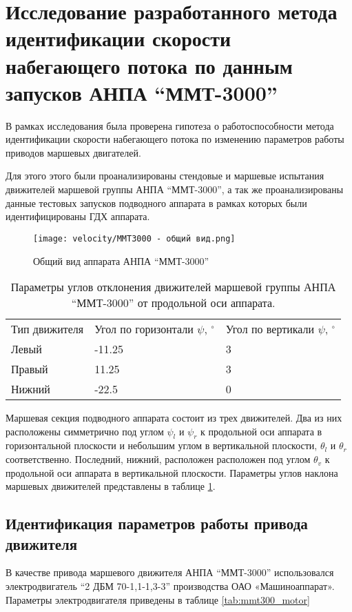 \section{Исследование разработанного метода идентификации скорости набегающего потока по данным запусков АНПА ``ММТ-3000''}
В рамках исследования была проверена гипотеза о работоспособности метода идентификации скорости набегающего потока по изменению параметров работы приводов маршевых двигателей.

Для этого этого были проанализированы стендовые и маршевые испытания движителей маршевой группы АНПА ``ММТ-3000'', а так же проанализированы данные тестовых запусков подводного аппарата в рамках которых были идентифицированы ГДХ аппарата.

\begin{figure}[ht]
    \centering
    \texttt{[image: velocity/MMT3000 - общий вид.png]}
    \caption{Общий вид аппарата АНПА ``ММТ-3000''}
    \label{fig:mmt-3000}
\end{figure}

\begin{table}
    \caption{Параметры углов отклонения движителей маршевой группы АНПА ``ММТ-3000'' от продольной оси аппарата.}
    \label{tab:mmt3000_propulsion_angles}
    \centering
    \begin{tabular}{lll}
        Тип движителя & Угол по горизонтали $\psi$, $^{\circ}$  & Угол по вертикали $\psi$, $^{\circ}$ \\
        Левый  & -11.25 & 3 \\
        Правый &  11.25 & 3 \\
        Нижний &  -22.5 & 0
    \end{tabular}
\end{table}

Маршевая секция подводного аппарата состоит из трех движителей.
Два из них расположены симметрично под углом $\psi_l$ и $\psi_r$ к продольной оси аппарата в горизонтальной плоскости и небольшим углом в вертикальной плоскости, $\theta_l$ и $\theta_r$ соответственно.
Последний, нижний, расположен расположен под углом $\theta_v$ к продольной оси аппарата в вертикальной плоскости.
Параметры углов наклона маршевых движителей представлены в таблице \ref{tab:mmt3000_propulsion_angles}.

\subsection{Идентификация параметров работы привода движителя}
В качестве привода маршевого движителя АНПА ``ММТ-3000'' использовался электродвигатель ``2 ДБМ 70-1,1-1,3-3'' производства ОАО «Машиноаппарат».
Параметры электродвигателя приведены в таблице \ref{tab:mmt300_motor}

